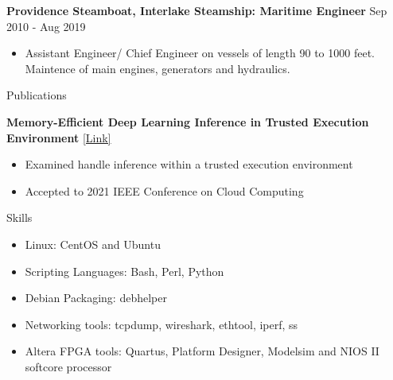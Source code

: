 \documentclass[10pt,a4paper]{article}
\begin{document}
{\begin{tcolorbox}
  \large{\textbf{Providence Steamboat, Interlake Steamship: Maritime Engineer}}
  \hfill
  \large{Sep 2010 - Aug 2019}
  \begin{itemize}[noitemsep]
    \item Assistant Engineer/ Chief Engineer on vessels of length 90 to 1000 feet. Maintence of main engines, generators and hydraulics.
  \end{itemize}

\end{tcolorbox}

\begin{tcolorbox}

  {\selectfont
    \begin{center}
      \LARGE{Publications}
    \end{center}
  }

  \tcblower

  \large\textbf{Memory-Efficient Deep Learning Inference in Trusted Execution Environment }
  \href{http://arxiv-export-lb.library.cornell.edu/abs/2104.15109?context=cs.LG}{[Link]}
  \begin{itemize}[noitemsep]
    \item Examined handle inference within a trusted execution environment
    \item Accepted to 2021 IEEE Conference on Cloud Computing
  \end{itemize}
\end{tcolorbox}


\begin{tcolorbox}

  {\selectfont
    \begin{center}
      \LARGE{Skills}
    \end{center}
  }

  \tcblower

  \begin{multicols}{2}
  \begin{itemize}[noitemsep]
    \item{Linux: CentOS and Ubuntu}
    \item{Scripting Languages: Bash, Perl, Python}
    \item{Debian Packaging: debhelper}
    \item{Networking tools: tcpdump, wireshark, ethtool, iperf, ss}
    \item{Altera FPGA tools: Quartus, Platform Designer, Modelsim and NIOS II softcore processor}
  \end{itemize}
  \end{multicols}

\end{tcolorbox}

}
\end{document}
